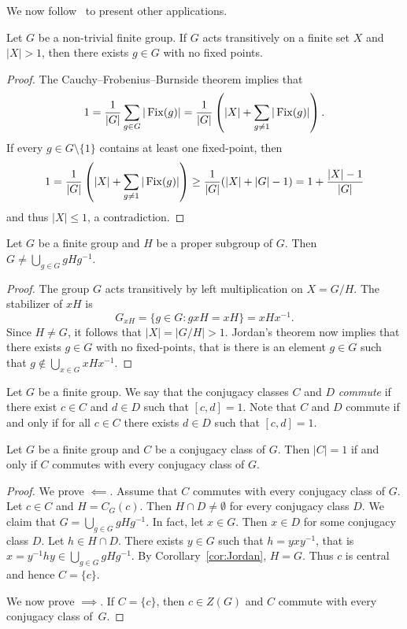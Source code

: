 We now follow~\cite{MR1997347} to present other applications. 

\begin{theorem}[Jordan]
    Let $G$ be a non-trivial finite group. If $G$ acts transitively 
    on a finite set $X$ and $|X|>1$, then there exists 
    $g\in G$ with no fixed points.
\end{theorem}

\begin{proof}
    The Cauchy--Frobenius--Burnside theorem implies that
    \[
    1=\frac{1}{|G|}\sum_{g\in G}|\operatorname{Fix}(g)|=\frac{1}{|G|}\left(|X|+\sum_{g\ne 1}|\operatorname{Fix}(g)|\right).
    \]
    If every $g\in G\setminus\{1\}$ contains at least one fixed-point, then
    \[
    1=\frac{1}{|G|}\left(|X|+\sum_{g\ne 1}|\operatorname{Fix}(g)|\right)\geq \frac{1}{|G|}(|X|+|G|-1)=1+\frac{|X|-1}{|G|}
    \]
    and thus $|X|\leq1$, a contradiction. 
\end{proof}

\begin{corollary}
\label{cor:Jordan}
    Let $G$ be a finite group and $H$ be a proper subgroup of $G$. 
    Then $G\ne\bigcup_{g\in G}gHg^{-1}$.
\end{corollary}

\begin{proof}
    The group $G$ acts transitively by left multiplication on $X=G/H$. The stabilizer
    of $xH$ is 
    \[
    G_{xH}=\{g\in G:gxH=xH\}=xHx^{-1}.
    \]
    Since $H\ne G$, it follows that $|X|=|G/H|>1$. Jordan's theorem now implies
    that there exists $g\in G$ with no fixed-points, that is 
    there is an element $g\in G$ such that $g\not\in\bigcup_{x\in G}xHx^{-1}$. 
\end{proof}

Let $G$ be a finite group. We say that the conjugacy classes $C$ and $D$ 
\emph{commute} if there exist 
$c\in C$ and $d\in D$ such that $[c,d]=1$. 
Note that $C$ and $D$ commute if and only if for all $c\in C$ there exists $d\in D$ 
such that $[c,d]=1$. 

\begin{corollary}[Wildon]
    Let $G$ be a finite group and $C$ be a conjugacy class of $G$. 
    Then $|C|=1$ if and only if $C$ commutes 
    with every conjugacy class of $G$.
\end{corollary}
    
\begin{proof}
    We prove $\impliedby$. 
    Assume that $C$ commutes with every conjugacy class of $G$. 
    Let $c\in C$ and $H=C_G(c)$. Then $H\cap D\ne\emptyset$ for every conjugacy class
    $D$. We claim that $G=\bigcup_{g\in G}gHg^{-1}$. In fact, let $x\in G$. Then
    $x\in D$ 
    for some conjugacy class $D$. 
    Let 
    $h\in H\cap D$. There exists $y\in G$ such that $h=yxy^{-1}$, that is
    $x=y^{-1}hy\in \bigcup_{g\in G}gHg^{-1}$. By Corollary~\ref{cor:Jordan},  
    $H=G$. Thus $c$ is central and hence $C=\{c\}$. 
    
    We now prove $\implies$. If $C=\{c\}$, then $c\in Z(G)$ and $C$ commute with every 
    conjugacy class of~$G$. 
\end{proof}

